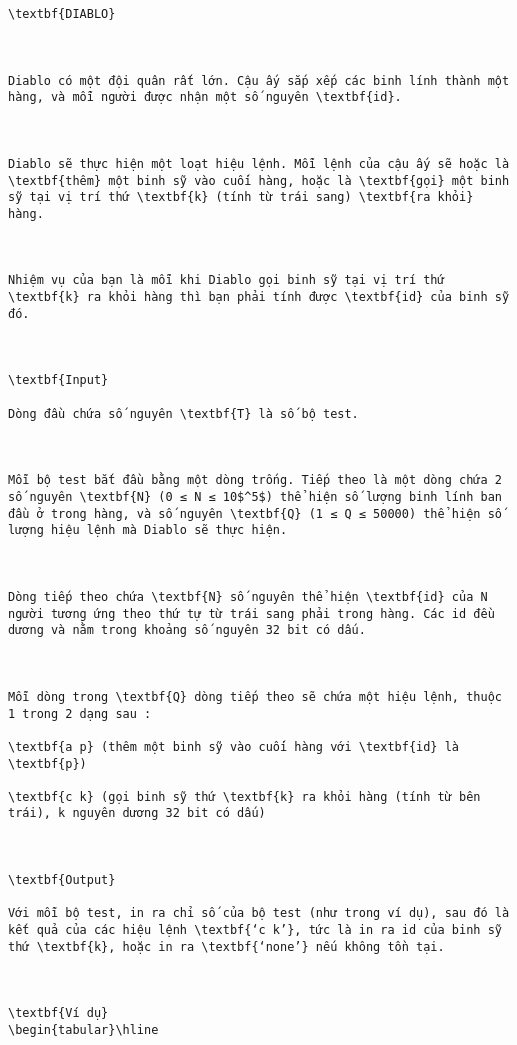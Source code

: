 
\begin{verbatim}



\textbf{DIABLO}

 

Diablo có một đội quân rất lớn. Cậu ấy sắp xếp các binh lính thành một hàng, và mỗi người được nhận một số nguyên \textbf{id}.

 

Diablo sẽ thực hiện một loạt hiệu lệnh. Mỗi lệnh của cậu ấy sẽ hoặc là \textbf{thêm} một binh sỹ vào cuối hàng, hoặc là \textbf{gọi} một binh sỹ tại vị trí thứ \textbf{k} (tính từ trái sang) \textbf{ra khỏi} hàng.

 

Nhiệm vụ của bạn là mỗi khi Diablo gọi binh sỹ tại vị trí thứ \textbf{k} ra khỏi hàng thì bạn phải tính được \textbf{id} của binh sỹ đó.

 

\textbf{Input}

Dòng đầu chứa số nguyên \textbf{T} là số bộ test.

 

Mỗi bộ test bắt đầu bằng một dòng trống. Tiếp theo là một dòng chứa 2 số nguyên \textbf{N} (0 ≤ N ≤ 10$^5$) thể hiện số lượng binh lính ban đầu ở trong hàng, và số nguyên \textbf{Q} (1 ≤ Q ≤ 50000) thể hiện số lượng hiệu lệnh mà Diablo sẽ thực hiện.

 

Dòng tiếp theo chứa \textbf{N} số nguyên thể hiện \textbf{id} của N người tương ứng theo thứ tự từ trái sang phải trong hàng. Các id đều dương và nằm trong khoảng số nguyên 32 bit có dấu.

 

Mỗi dòng trong \textbf{Q} dòng tiếp theo sẽ chứa một hiệu lệnh, thuộc 1 trong 2 dạng sau :

\textbf{a p} (thêm một binh sỹ vào cuối hàng với \textbf{id} là \textbf{p})

\textbf{c k} (gọi binh sỹ thứ \textbf{k} ra khỏi hàng (tính từ bên trái), k nguyên dương 32 bit có dấu)

 

\textbf{Output}

Với mỗi bộ test, in ra chỉ số của bộ test (như trong ví dụ), sau đó là kết quả của các hiệu lệnh \textbf{‘c k’}, tức là in ra id của binh sỹ thứ \textbf{k}, hoặc in ra \textbf{‘none’} nếu không tồn tại.

 

\textbf{Ví dụ}
\begin{tabular}\hline 



\end{verbatim}
